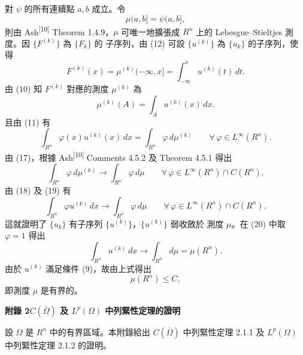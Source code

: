 \documentclass[11pt,a4paper,twoside]{article}
\begin{document}
\newpage

對 $\psi$ 的所有連續點 $a,b$ 成立。令
\[
    \mu(a,b]=\psi(a,b],
\]
則由 Ash\textsuperscript{[10]} Theorem 1.4.9，$\mu$ 可唯一地擴張成
$R^n$ 上的 Lebesgue--Stieltjes 測度。因 $\{F^{(k)}\}$ 為 $\{F_k\}$ 的
子序列，由 (12) 可設 $\{u^{(k)}\}$ 為 $\{u_k\}$ 的子序列，使得
\[
    F^{(k)}(x)
    =
    \mu^{(k)}(-\infty,x]
    =
    \int_{-\infty}^{x}u^{(k)}(t)\,dt.
\]
由 (10) 知 $F^{(k)}$ 對應的測度 $\mu^{(k)}$ 為
\[
    \mu^{(k)}(A)=\int_Au^{(k)}(x)\,dx.
\]
且由 (11) 有
\[
    \int_{R^n}\varphi(x)u^{(k)}(x)\,dx
    =
    \int_{R^n}\varphi\,d\mu^{(k)}
    \qquad
    \forall\,\varphi\in L^\infty(R^n).
    \tag{18}
\]
由 (17)，根據 Ash\textsuperscript{[10]} Comments 4.5.2 及
Theorem 4.5.1 得出
\[
    \int_{R^n}\varphi\,d\mu^{(k)}
    \longrightarrow
    \int_{R^n}\varphi\,d\mu
    \qquad
    \forall\,\varphi\in L^\infty(R^n)\cap C(R^n).
    \tag{19}
\]
由 (18) 及 (19) 有
\[
    \int_{R^n}\varphi u^{(k)}\,dx
    \longrightarrow
    \int_{R^n}\varphi\,d\mu
    \qquad
    \forall\,\varphi\in L^\infty(R^n)\cap C(R^n).
    \tag{20}
\]
這就證明了 $\{u_k\}$ 有子序列 $\{u^{(k)}\}$，$\{u^{(k)}\}$ 弱收斂於
測度 $\mu$。在 (20) 中取 $\varphi=1$ 得出
\[
    \int_{R^n}u^{(k)}\,dx
    \longrightarrow
    \int_{R^n}d\mu
    =
    \mu(R^n).
\]
由於 $u^{(k)}$ 滿足條件 (9)，故由上式得出
\[
    \mu(R^n)\le C,
\]
即測度 $\mu$ 是有界的。

\newpage

\begin{center}
    {\Large\bfseries 附錄 2\quad $C(\overline{\Omega})$ 及 $L^p(\Omega)$ 中列緊性定理的證明}
\end{center}

設 $\Omega$ 是 $R^n$ 中的有界區域。本附錄給出
$C(\overline{\Omega})$ 中列緊性定理 2.1.1 及
$L^p(\Omega)$ 中列緊性定理 2.1.2 的證明。
\end{document}
